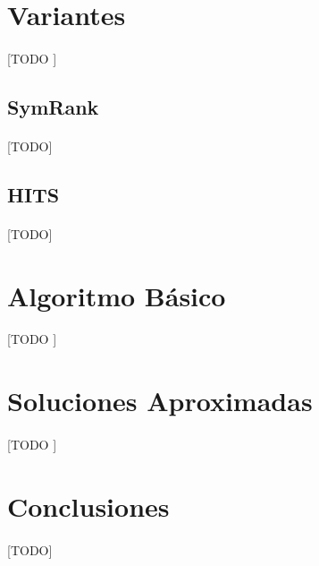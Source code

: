 \documentclass{subfiles}
\begin{document}
    \section{Variantes}
    \label{sec:pagerank_variants}

      \paragraph{}
      [TODO ]

      \subsection{SymRank}
      \label{sec:symrank}

        \paragraph{}
        [TODO]

      \subsection{HITS}
      \label{sec:hits}

        \paragraph{}
        [TODO]

    \section{Algoritmo Básico}
    \label{sec:pagerank_algorithm}

      \paragraph{}
      [TODO ]

    \section{Soluciones Aproximadas}
    \label{sec:pagerank_algorithm_approximated}

      \paragraph{}
      [TODO ]

    \section{Conclusiones}
    \label{sec:pagerank_conclusions}

      \paragraph{}
      [TODO]
\end{document}
